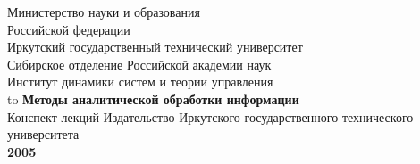 \documentclass[12pt, openany, twoside]{book} %
\begin{document}
\def\chaptername{Тема}
\def\thechapter{\Roman{chapter}}
\def\thefigure{\arabic{section}.\arabic{figure}}
\def\thetable{\arabic{section}.\arabic{table}}
\fancyhf{} %
\fancyhead[RE]{\slshape \leftmark}
\fancyhead[LO]{\slshape \rightmark}
\fancyhead[RO,LE]{\slshape \thepage}
\renewcommand{\headrulewidth}{1pt}
\renewcommand{\footrulewidth}{0pt}%
\pagestyle{fancy}
\begin{titlepage}
\thispagestyle{empty}
\begin{center}
Министерство науки и образования\\
Российской федерации\\
{\sc Иркутский государственный технический университет}\\[0.5em]

{Сибирское отделение Российской академии наук}\\
{\sc Институт динамики систем и теории управления}\\
\vfill
 \hbox to \linewidth{\hfill Е.А.~Черкашин}
 \vfill
{\large\bf Методы аналитической обработки информации}\\
{Конспект лекций}
\vfill
\vfill
\vfill
 Издательство Иркутского государственного технического университета\\
 {\bf 2005}
\end{center}
\end{titlepage}
\end{document}
